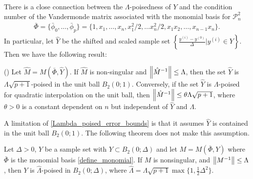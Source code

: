 \color{black}

There is a close connection between the $\Lambda$-poisedness of $Y$ and the condition number of the Vandermonde matrix 
associated with the monomial basis for $\mathcal{P}^2_n$
\begin{align}
\label{define_monomial}
\bar{\Phi} = \{ \bar{\phi}_0, \ldots, \bar{\phi}_p\} =\{1, x_1, \ldots, x_n, x_1^2/2, \ldots x_n^2/2,x_1 x_2, \ldots, x_{n-1}x_{n}\}.
\end{align}
In particular, let $\hat{Y}$ be the shifted and scaled sample set $\left\{\frac{y^{(i)}-y^{(0)}}{\Delta}|y^{(i)} \in Y\right\}$.
Then we have the following result:

\begin{theorem}
\label{Lambda_poised_error_bounds}

(\cite[Theorem 3.14]{introduction_book}) Let $\hat{M} = M(\bar{\Phi},\hat{Y})$.  
If $\hat{M}$ is  non-singular and ${\left\|\hat{M}^{-1}\right\|} \le \Lambda$,   
then the set $\hat{Y}$ is $\Lambda  \sqrt{p+1}$-poised in the unit ball $B_2(0;1)$.  
Conversely, if the set $\hat{Y}$ is $\Lambda$-poised for quadratic interpolation on the unit ball, 
then ${\left\|\hat{M}^{-1}\right\|} \le \theta \Lambda \sqrt{p+1}$, where $\theta > 0$ is a 
constant dependent on $n$ but independent of $\hat{Y}$ and $\Lambda$.
\end{theorem}

A limitation of \cref{Lambda_poised_error_bounds} is that it assumes $\hat{Y}$ is contained in the unit ball $B_2(0;1)$.
The following theorem does not make this assumption.

\begin{theorem}
\label{Lambda_poised_error_bounds_delta}

Let $\Delta >0$, $Y$ be a sample set with $Y \subset B_2(0;\Delta)$ and let $M=M(\bar{\Phi},Y)$ where $\bar{\Phi}$ is the monomial basis \cref{define_monomial}.
If $M$ is nonsingular, and ${\left\|M^{-1}\right\|} \le \Lambda$, then $Y$ is $\hat{\Lambda}$-poised in $B_2(0;\Delta)$,
where $\hat{\Lambda} = \Lambda \sqrt{p+1}\max\{1, \frac 1 2 \Delta^2\}$.
\end{theorem}

